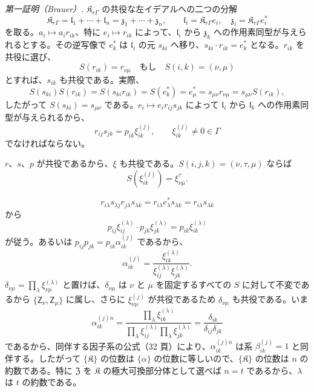 \emph{第一証明（Brauer）.} \(\mathfrak K_{r\Gamma}\) の共役な左イデアルへの二つの分解
\[
\mathfrak K_{r\Gamma}=\mathfrak l_1+\cdots+\mathfrak l_n
=\mathfrak z_1+\cdots+\mathfrak z_n,\qquad
\mathfrak l_i=\mathfrak K_{r\Gamma}e_i,\quad
\mathfrak z_i=\mathfrak K_{r\Gamma}e_i^*
\]
を取る。\(a_i\mapsto a_ir_{ik}\)、特に \(e_i\mapsto r_{ik}\) によって、\(\mathfrak l_i\) から \(\mathfrak z_k\) への作用素同型が与えられるとする。その逆写像で \(e_k^*\) は \(\mathfrak l_i\) の元 \(s_{ki}\) へ移り、\(s_{ki}\cdot r_{ik}=e_k^*\) となる。\(r_{ik}\) を共役に選び、
\[
S(r_{ik})=r_{\nu\mu}\quad\text{もし}\quad S(i,k)=(\nu,\mu)
\]
とすれば、\(s_{ik}\) も共役である。実際、
\[
S(s_{ki})S(r_{ik})=S(s_{ki}r_{ik})=S(e_k^*)=e_\mu^*
=s_{\mu\nu}r_{\nu\mu}=s_{\mu\nu}S(r_{ik}),
\]
したがって \(S(s_{ki})=s_{\mu\nu}\) である。\(e_i\mapsto e_ir_{ij}s_{jk}\) によって \(\mathfrak l_i\) から \(\mathfrak l_k\) への作用素同型が与えられるから、
\[
r_{ij}s_{jk}=p_{ik}\xi_{ik}^{(j)},\qquad
\xi_{ik}^{(j)}\ne0\in\Gamma
\]
でなければならない。

\(r\)、\(s\)、\(p\) が共役であるから、\(\xi\) も共役である。\(S(i,j,k)=(\nu,\tau,\mu)\) ならば
\[
S(\xi_{ik}^{(j)})=\xi_{\nu\mu}^{\tau}.
\]

\[
r_{i\lambda}s_{\lambda j}r_{j\lambda}s_{\lambda k}
=r_{i\lambda}e_\lambda^*s_{\lambda k}
=r_{i\lambda}s_{\lambda k}
\]
から
\[
p_{ij}\xi_{ij}^{(\lambda)}\cdot p_{jk}\xi_{jk}^{(\lambda)}
=p_{ik}\xi_{ik}^{(\lambda)}
\]
が従う。あるいは \(p_{ij}p_{jk}=p_{ik}\alpha_{ik}^{(j)}\) であるから、
\[
\alpha_{ik}^{(j)}
=\frac{\xi_{ik}^{(\lambda)}}{\xi_{ij}^{(\lambda)}\xi_{jk}^{(\lambda)}}.
\]
\(\delta_{\nu\mu}=\prod_\lambda\xi_{\nu\mu}^{(\lambda)}\) と置けば、\(\delta_{\nu\mu}\) は \(\nu\) と \(\mu\) を固定するすべての \(S\) に対して不変であるから \(\{\mathsf{Z}_\nu,\mathsf{Z}_\mu\}\) に属し、さらに \(\xi_{\nu\mu}^{(j)}\) が共役であるため \(\delta_{\nu\mu}\) も共役である。いま
\[
\alpha_{ik}^{(j)n}
=\frac{\prod_\lambda\xi_{ik}^{(\lambda)}}
       {\prod_\lambda\xi_{ij}^{(\lambda)}\prod_\lambda\xi_{jk}^{(\lambda)}}
=\frac{\delta_{ik}}{\delta_{ij}\delta_{jk}}
\]
であるから、同伴する因子系の公式（32 頁）により、\(\alpha_{ik}^{(j)n}\) は系 \(\beta_{ik}^{(j)}=1\) と同伴する。したがって \(\{\mathfrak K\}\) の位数は \(\{\alpha\}\) の位数に等しいので、\(\{\mathfrak K\}\) の位数は \(n\) の約数である。特に \(\mathfrak Z\) を \(\mathfrak K\) の極大可換部分体として選べば \(n=t\) であるから、\(\lambda\) は \(t\) の約数である。


